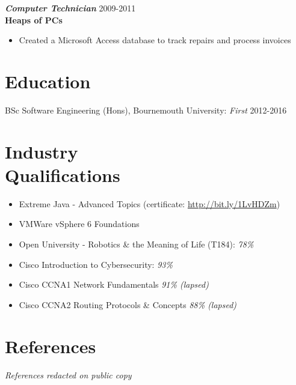 \documentclass[margin, 10pt]{res} %
\begin{document}
\begin{resume}
    {\sl \textbf{Computer Technician}} \hfill 2009-2011\\
    \textbf{Heaps of PCs}
    \begin{itemize} 
    \item Created a Microsoft Access database to track repairs and process invoices
    \end{itemize} 
    
    
    
    \section{Education}
    BSc Software Engineering (Hons), Bournemouth University: {\sl First} \hfill 2012-2016
    
    
    \section{Industry \\Qualifications} 
    \begin{itemize} 
    \item Extreme Java - Advanced Topics (certificate: \href{http://bit.ly/1LvHDZm}{http://bit.ly/1LvHDZm})
    \item VMWare vSphere 6 Foundations
    \item Open University - Robotics \& the Meaning of Life (T184): {\sl 78\%}
    \item Cisco Introduction to Cybersecurity: {\sl 93\%}
    \item Cisco CCNA1 Network Fundamentals {\sl 91\% (lapsed)}
    \item Cisco CCNA2 Routing Protocols \& Concepts {\sl 88\% (lapsed)}
    \end{itemize} 
     
    \section{References}
    {\sl References redacted on public copy}
    
    
    \end{resume}
    
\end{document}
